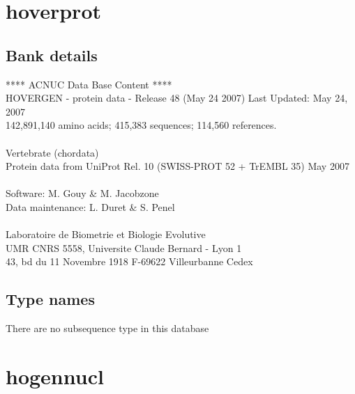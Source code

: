 \documentclass{article}
\begin{document}
\begin{Schunk}
\section{ hoverprot }
\subsection{Bank details}
               ****     ACNUC Data Base Content      ****                       \\
 HOVERGEN - protein data - Release 48 (May 24 2007) Last Updated: May 24, 2007\\
          142,891,140 amino acids; 415,383 sequences; 114,560 references.\\
\\
                       Vertebrate (chordata)	  \\
    Protein data from UniProt Rel. 10 (SWISS-PROT 52 + TrEMBL 35) May 2007\\
\\
Software: M. Gouy \& M. Jacobzone\\
Data maintenance: L. Duret \& S. Penel\\
\\
Laboratoire de Biometrie et Biologie Evolutive\\
UMR CNRS 5558, Universite Claude Bernard - Lyon 1 \\
43, bd du 11 Novembre 1918 F-69622 Villeurbanne Cedex\\


\subsection{Type names}
There are no subsequence type in this database
\section{ hogennucl }

\end{Schunk}
\end{document}
